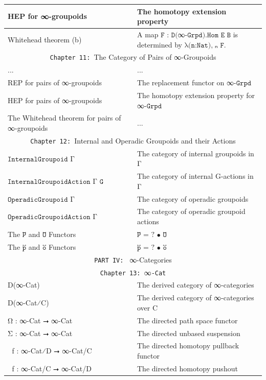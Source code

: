 \documentclass{book}
\theoremstyle{definition}
\begin{document}
{\begin{longtable}{|| l || l ||}
\hline
HEP for ∞-groupoids & The homotopy extension property\\
\hline
Whitehead theorem (b) & A map $\texttt{F : D(}$∞$\texttt{-Grpd).Hom E B}$ is determined by $\texttt{λ(n:Nat),}$π⃡ₙ
$\texttt{F}$. \\
\hline \hline
\multicolumn{2}{||c||}{\texttt{Chapter 11: }The Category of Pairs of ∞-Groupoids} \\
\hline \hline
... & ...\\
\hline
REP for pairs of ∞-groupoids & The replacement functor on ∞$\texttt{-Grpd}$ \\
\hline
HEP for pairs of ∞-groupoids & The homotopy extension property for ∞$\texttt{-Grpd}$\\
 \hline 
The Whitehead theorem for pairs of ∞-groupoids & ... \\
\hline \hline
\multicolumn{2}{||c||}{\texttt{Chapter 12: }Internal and Operadic Groupoids and their Actions} \\
\hline \hline
 $\texttt{InternalGroupoid Γ}$   & The category of internal groupoids in Γ \\
 \hline
 $\texttt{InternalGroupoidAction Γ G}$ & The category of internal G-actions in Γ \\
 \hline
  $\texttt{OperadicGroupoid Γ}$  & The category of operadic groupoids  \\
 \hline
 $\texttt{OperadicGroupoidAction Γ}$  & The category of operadic groupoid actions  \\
  \hline
  The $\texttt{P⃡}$ and $\texttt{O⃡}$ Functors & $\texttt{P⃡ = ? • O⃡}$ \\
 \hline
 The $\texttt{p⃡}$ and $\texttt{o⃡}$ Functors & $\texttt{p⃡ = ? • o⃡}$ \\
 \hline \hline
 \multicolumn{2}{||c||}{\texttt{PART IV: } ∞-Categories} \\
\hline \hline
\multicolumn{2}{||c||}{\texttt{Chapter 13: }∞\texttt{-Cat}} \\
\hline \hline
D(∞-Cat) & The derived category of ∞-categories \\
\hline
D(∞-Cat⁄C) & The derived category of ∞-categories over C \\
\hline
Ω⃗ : ∞-Cat ⭢ ∞-Cat & The directed path space functor \\
 \hline 
 Σ⃗ : ∞-Cat ⭢ ∞-Cat & The directed unbased suspension \\
\hline 
ω⃗ f : ∞-Cat⁄D ⭢ ∞-Cat/C & The directed homotopy pullback functor\\
 \hline 
 σ⃗ f : ∞-Cat/C ⭢ ∞-Cat/D & The directed homotopy pushout \\

\end{longtable}}
\end{document}

